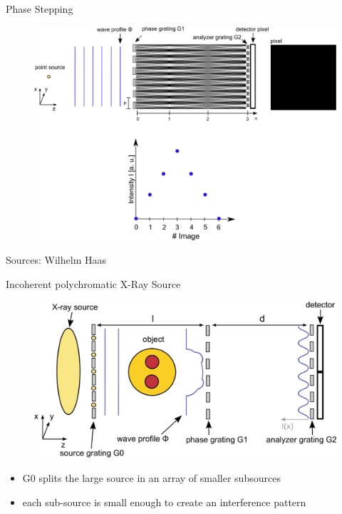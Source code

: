 \begin{frame}{Phase Stepping}
    \vspace{-0.5cm}
    \begin{figure}
        \includegraphics[height=0.92\textheight]{images/phase7.eps}
    \end{figure}
    \begin{flushright}
        \scriptsize Sources: Wilhelm Haas
    \end{flushright}
\end{frame}



\begin{frame}{Incoherent polychromatic X-Ray Source}
    \vspace{-0.5cm}
    \begin{figure}
        \includegraphics[width=0.75\linewidth]{images/inco-updated2.eps}
    \end{figure}
    \begin{itemize}
        \item G0 splits the large source in an array of smaller subsources
        \item each sub-source is small enough to create an interference pattern
    \end{itemize}
\end{frame}

